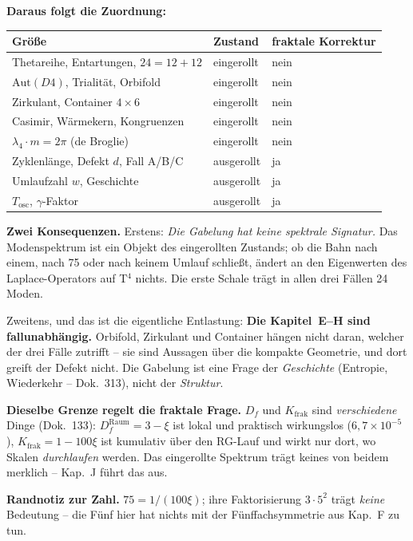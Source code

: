 \textbf{Daraus folgt die Zuordnung:}

\begin{center}
\begin{tabular}{lll}
\toprule
Größe & Zustand & fraktale Korrektur \\
\midrule
Thetareihe, Entartungen, $24 = 12+12$ & eingerollt & nein \\
$\text{Aut}(D4)$, Trialität, Orbifold & eingerollt & nein \\
Zirkulant, Container $4\times6$ & eingerollt & nein \\
Casimir, Wärmekern, Kongruenzen & eingerollt & nein \\
$\lambda_4\cdot m = 2\pi$ (de Broglie) & eingerollt & nein \\
\midrule
Zyklenlänge, Defekt $d$, Fall A/B/C & ausgerollt & ja \\
Umlaufzahl $w$, Geschichte & ausgerollt & ja \\
$T_\text{osc}$, $\gamma$-Faktor & ausgerollt & ja \\
\bottomrule
\end{tabular}
\end{center}

\textbf{Zwei Konsequenzen.} Erstens: \emph{Die Gabelung hat keine
spektrale Signatur.} Das Modenspektrum ist ein Objekt des
eingerollten Zustands; ob die Bahn nach einem, nach 75 oder nach
keinem Umlauf schließt, ändert an den Eigenwerten des
Laplace-Operators auf T$^4$ nichts. Die erste Schale trägt in
allen drei Fällen 24 Moden.

Zweitens, und das ist die eigentliche Entlastung: \textbf{Die
Kapitel~E--H sind fallunabhängig.} Orbifold, Zirkulant und
Container hängen nicht daran, welcher der drei Fälle zutrifft --
sie sind Aussagen über die kompakte Geometrie, und dort greift
der Defekt nicht. Die Gabelung ist eine Frage der
\emph{Geschichte} (Entropie, Wiederkehr -- Dok.~313), nicht der
\emph{Struktur}.

\textbf{Dieselbe Grenze regelt die fraktale Frage.} $D_f$ und
$K_\text{frak}$ sind \emph{verschiedene} Dinge (Dok.~133):
$D_f^\text{Raum} = 3-\xi$ ist lokal und praktisch wirkungslos
($6{,}7\times10^{-5}$), $K_\text{frak} = 1-100\xi$ ist kumulativ
über den RG-Lauf und wirkt nur dort, wo Skalen \emph{durchlaufen}
werden. Das eingerollte Spektrum trägt keines von beidem merklich
-- Kap.~J führt das aus.

\textbf{Randnotiz zur Zahl.} $75 = 1/(100\xi)$; ihre
Faktorisierung $3\cdot5^2$ trägt \emph{keine} Bedeutung -- die
Fünf hier hat nichts mit der Fünffachsymmetrie aus Kap.~F zu tun.

